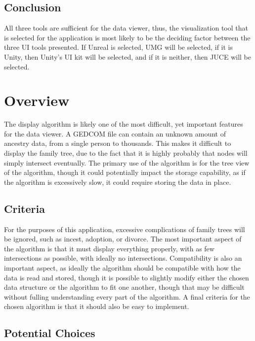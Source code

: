\documentclass[onecolumn, draftclsnofoot,10pt, compsoc]{IEEEtran}
\begin{document}
\subsection{Conclusion}
All three tools are sufficient for the data viewer, thus, the visualization tool that is selected for the application is most likely to be the deciding factor between the three UI tools presented. If Unreal is selected, UMG will be selected, if it is Unity, then Unity's UI kit will be selected, and if it is neither, then JUCE will be selected.

\section{Overview}
The display algorithm is likely one of the most difficult, yet important features for the data viewer. A GEDCOM file can contain an unknown amount of ancestry data, from a single person to thousands. This makes it difficult to display the family tree, due to the fact that it is highly probably that nodes will simply intersect eventually. The primary use of the algorithm is for the tree view of the algorithm, though it could potentially impact the storage capability, as if the algorithm is excessively slow, it could require storing the data in place.

\subsection{Criteria}
For the purposes of this application, excessive complications of family trees will be ignored, such as incest, adoption, or divorce. The most important aspect of the algorithm is that it must display everything properly, with as few intersections as possible, with ideally no intersections. Compatibility is also an important aspect, as ideally the algorithm should be compatible with how the data is read and stored, though it is possible to slightly modify either the chosen data structure or the algorithm to fit one another, though that may be difficult without fulling understanding every part of the algorithm. A final criteria for the chosen algorithm is that it should also be easy to implement.
\subsection{Potential Choices}
\end{document}
